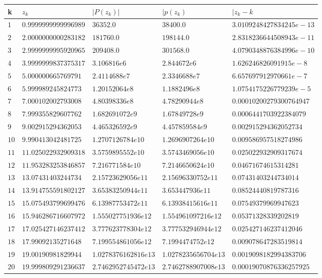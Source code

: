 \documentclass{article}
\begin{document}
\begin{center}
	\begin{tabular}{|p{}|p{}|p{}|p{}|p{4cm}|} \hline
		\textbf{k} & \textbf{$z_{k}$} & \textbf{$|P(z_{k})|$} & \textbf{$|p(z_{k})$} & \textbf{$|z_{k} - k$}  \\
		\hline 
		$1$ & $0.9999999999996989$ & $36352.0$ & $38400.0$ & $3.0109248427834245e-13$ \\ 
		\hline 
		$2$ & $2.0000000000283182$ & $181760.0$ & $198144.0$ & $2.8318236644508943e-11$ \\ 
		\hline 
		$3$ & $2.9999999995920965$ & $209408.0$ & $301568.0$ & $4.0790348876384996e-10$ \\ 
		\hline 
		$4$ & $3.9999999837375317$ & $3.106816e6$ & $2.844672e6$ & $1.626246826091915e-8$ \\ 
		\hline 
		$5$ & $5.000000665769791$ & $2.4114688e7$ & $2.3346688e7$ & $6.657697912970661e-7$ \\ 
		\hline 
		$6$ & $5.999989245824773$ & $1.20152064e8$ & $1.1882496e8$ & $1.0754175226779239e-5$ \\ 
		\hline 
		$7$ & $7.000102002793008$ & $4.80398336e8$ & $4.78290944e8$ & $0.00010200279300764947$ \\ 
		\hline 
		$8$ & $7.999355829607762$ & $1.682691072e9$ & $1.67849728e9$ & $0.0006441703922384079$ \\ 
		\hline 
		$9$ & $9.002915294362053$ & $4.465326592e9$ & $4.457859584e9$ & $0.002915294362052734$ \\ 
		\hline 
		$10$ & $9.990413042481725$ & $1.2707126784e10$ & $1.2696907264e10$ & $0.009586957518274986$ \\ 
		\hline 
		$11$ & $11.025022932909318$ & $3.5759895552e10$ & $3.5743469056e10$ & $0.025022932909317674$ \\ 
		\hline 
		$12$ & $11.953283253846857$ & $7.216771584e10$ & $7.2146650624e10$ & $0.04671674615314281$ \\ 
		\hline 
		$13$ & $13.07431403244734$ & $2.15723629056e11$ & $2.15696330752e11$ & $0.07431403244734014$ \\ 
		\hline 
		$14$ & $13.914755591802127$ & $3.65383250944e11$ & $3.653447936e11$ & $0.08524440819787316$ \\ 
		\hline 
		$15$ & $15.075493799699476$ & $6.13987753472e11$ & $6.13938415616e11$ & $0.07549379969947623$ \\ 
		\hline 
		$16$ & $15.946286716607972$ & $1.555027751936e12$ & $1.554961097216e12$ & $0.05371328339202819$ \\ 
		\hline 
		$17$ & $17.025427146237412$ & $3.777623778304e12$ & $3.777532946944e12$ & $0.025427146237412046$ \\ 
		\hline 
		$18$ & $17.99092135271648$ & $7.199554861056e12$ & $7.1994474752e12$ & $0.009078647283519814$ \\ 
		\hline 
		$19$ & $19.00190981829944$ & $1.0278376162816e13$ & $1.0278235656704e13$ & $0.0019098182994383706$ \\ 
		\hline 
		$20$ & $19.999809291236637$ & $2.7462952745472e13$ & $2.7462788907008e13$ & $0.00019070876336257925$ \\ 
		\hline 
	\end{tabular}
\end{center}
\end{document}
